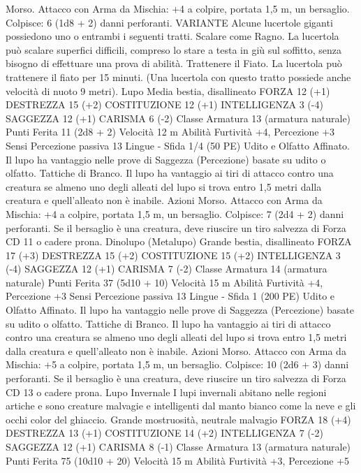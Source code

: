 \begin{multicols}{2}
Morso. Attacco con Arma da Mischia: +4 a colpire, portata 1,5
m, un bersaglio.
Colpisce: 6 (1d8 + 2) danni perforanti.
VARIANTE
Alcune lucertole giganti possiedono uno o entrambi i seguenti
tratti.
Scalare come Ragno. La lucertola può scalare superfici difficili,
compreso lo stare a testa in giù sul soffitto, senza bisogno di
effettuare una prova di abilità.
Trattenere il Fiato. La lucertola può trattenere il fiato per 15
minuti. (Una lucertola con questo tratto possiede anche velocità
di nuoto 9 metri).
Lupo
Media bestia, disallineato
FORZA 12 (+1)
DESTREZZA 15 (+2)
COSTITUZIONE 12 (+1)
INTELLIGENZA 3 (-4)
SAGGEZZA 12 (+1)
CARISMA 6 (-2)
Classe Armatura 13 (armatura naturale)
Punti Ferita 11 (2d8 + 2)
Velocità 12 m
Abilità Furtività +4, Percezione +3
Sensi Percezione passiva 13
Lingue -
Sfida 1/4 (50 PE)
Udito e Olfatto Affinato. Il lupo ha vantaggio nelle prove di
Saggezza (Percezione) basate su udito o olfatto.
Tattiche di Branco. Il lupo ha vantaggio ai tiri di attacco contro
una creatura se almeno uno degli alleati del lupo si trova entro
1,5 metri dalla creatura e quell’alleato non è inabile.
Azioni
Morso. Attacco con Arma da Mischia: +4 a colpire, portata 1,5
m, un bersaglio.
Colpisce: 7 (2d4 + 2) danni perforanti. Se il bersaglio è una
creatura, deve riuscire un tiro salvezza di Forza CD 11 o cadere
prona.
Dinolupo (Metalupo)
Grande bestia, disallineato
FORZA 17 (+3)
DESTREZZA 15 (+2)
COSTITUZIONE 15 (+2)
INTELLIGENZA 3 (-4)
SAGGEZZA 12 (+1)
CARISMA 7 (-2)
Classe Armatura 14 (armatura naturale)
Punti Ferita 37 (5d10 + 10)
Velocità 15 m
Abilità Furtività +4, Percezione +3
Sensi Percezione passiva 13
Lingue -
Sfida 1 (200 PE)
Udito e Olfatto Affinato. Il lupo ha vantaggio nelle prove di
Saggezza (Percezione) basate su udito o olfatto.
Tattiche di Branco. Il lupo ha vantaggio ai tiri di attacco contro
una creatura se almeno uno degli alleati del lupo si trova entro
1,5 metri dalla creatura e quell’alleato non è inabile.
Azioni
Morso. Attacco con Arma da Mischia: +5 a colpire, portata 1,5
m, un bersaglio.
Colpisce: 10 (2d6 + 3) danni perforanti. Se il bersaglio è una
creatura, deve riuscire un tiro salvezza di Forza CD 13 o cadere
prona.
Lupo Invernale
I lupi invernali abitano nelle regioni artiche e sono
creature malvagie e intelligenti dal manto bianco come
la neve e gli occhi color del ghiaccio.
Grande mostruosità, neutrale malvagio
FORZA 18 (+4)
DESTREZZA 13 (+1)
COSTITUZIONE 14 (+2)
INTELLIGENZA 7 (-2)
SAGGEZZA 12 (+1)
CARISMA 8 (-1)
Classe Armatura 13 (armatura naturale)
Punti Ferita 75 (10d10 + 20)
Velocità 15 m
Abilità Furtività +3, Percezione +5

\end{multicols}
